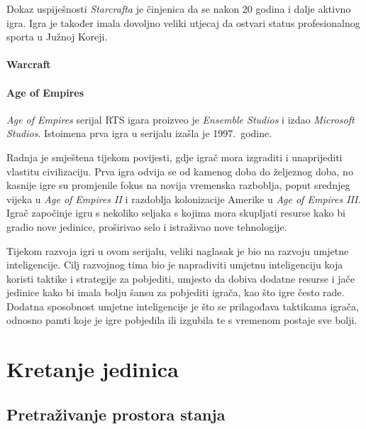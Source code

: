 \documentclass[times, utf8, zavrsni, numeric]{fer}
\begin{document}
\par Dokaz uspiješnosti \textit{Starcrafta} je činjenica da se nakon 20 godina i dalje aktivno igra.
Igra je također imala dovoljno veliki utjecaj da ostvari status profesionalnog sporta u Južnoj Koreji.

\subsubsection{Warcraft}

\subsubsection{Age of Empires}
\par \textit{Age of Empires} serijal RTS igara proizveo je \textit{Ensemble Studios} i izdao \textit{Microsoft Studios}. 
Istoimena prva igra u serijalu izašla je 1997.\ godine.

\par Radnja je smještena tijekom povijesti, gdje igrač mora izgraditi i unaprijediti vlastitu civilizaciju.
Prva igra odvija se od kamenog doba do željeznog doba, no kasnije igre su promjenile fokus na novija vremenska razboblja, poput srednjeg vijeka u \textit{Age of Empires II} i razdoblja kolonizacije Amerike u \textit{Age of Empires III}.
Igrač započinje igru s nekoliko seljaka s kojima mora skupljati resurse kako bi gradio nove jedinice, proširivao selo i istraživao nove tehnologije.

\par Tijekom razvoja igri u ovom serijalu, veliki naglasak je bio na razvoju umjetne inteligencije.
Cilj razvojnog tima bio je napradiviti umjetnu inteligenciju koja koristi taktike i strategije za pobjediti, umjesto da dobiva dodatne resurse i jače jedinice kako bi imala bolju šansu za pobjediti igrača, kao što igre često rade.
Dodatna sposobnost umjetne inteligencije je što se prilagođava taktikama igrača, odnosno pamti koje je igre pobjedila ili izgubila te s vremenom postaje sve bolji.

\chapter{Kretanje jedinica}\label{ch:pathfinding}

\section{Pretraživanje prostora stanja}\label{sec:stateSearch}
\end{document}
